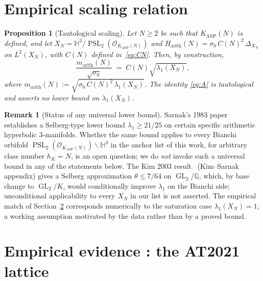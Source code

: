 \documentclass[11pt,a4paper]{article}
\newtheorem{proposition}[theorem]{Proposition}
\theoremstyle{definition}
\newtheorem{remark}[theorem]{Remark}
\DeclareMathOperator{\PSL}{PSL}
\DeclareMathOperator{\GL}{GL}
\newcommand{\KASP}{K_{\mathrm{ASP}}}
\newcommand{\Harith}{H_{\mathrm{arith}}}
\newcommand{\marith}{m_{\mathrm{arith}}}
\newcommand{\HH}{\mathbb{H}}
\newcommand{\QQ}{\mathbb{Q}}
\begin{document}
\section{Empirical scaling relation}\label{sec:thmA}

\begin{proposition}[Tautological scaling]\label{prop:scaling}
Let $N \geq 2$ be such that $\KASP(N)$ is defined, and let
$X_N = \HH^3/\PSL_2(\mathcal{O}_{\KASP(N)})$ and
$\Harith(N) = \sigma_0\,C(N)^2\,\Delta_{X_N}$ on $L^2(X_N)$, with $C(N)$
defined in~\eqref{eq:CN}. Then, by construction,
\begin{equation}\label{eq:A}
  \frac{\marith(N)}{\sqrt{\sigma_0}}
  \;=\; C(N)\sqrt{\lambda_1(X_N)},
\end{equation}
where $\marith(N) := \sqrt{\sigma_0\,C(N)^2\,\lambda_1(X_N)}$. The identity
\eqref{eq:A} is tautological and asserts no lower bound on $\lambda_1(X_N)$.
\end{proposition}

\begin{remark}[Status of any universal lower bound]\label{rem:noSarnak}
Sarnak's 1983 paper~\cite{Sarnak1983} establishes a Selberg-type lower
bound $\lambda_1 \geq 21/25$ on certain specific arithmetic hyperbolic
$3$-manifolds. Whether the same bound applies to every Bianchi orbifold
$\PSL_2(\mathcal{O}_{\KASP(N)})\backslash\HH^3$ in the anchor list of this
work, for arbitrary class number $h_K = N$, is an open question; we do
\emph{not} invoke such a universal bound in any of the statements below.
The Kim 2003 result~\cite{Kim2003} (Kim--Sarnak appendix) gives a Selberg
approximation $\theta \leq 7/64$ on $\GL_2/\QQ$, which, by base change to
$\GL_2/K$, would conditionally improve $\lambda_1$ on the Bianchi side;
unconditional applicability to every $X_N$ in our list is not asserted.
The empirical match of Section~\ref{sec:empirical} corresponds numerically
to the saturation case $\lambda_1(X_N)=1$, a working assumption motivated
by the data rather than by a proved bound.
\end{remark}

\section{Empirical evidence : the AT2021 lattice}\label{sec:empirical}
\end{document}
